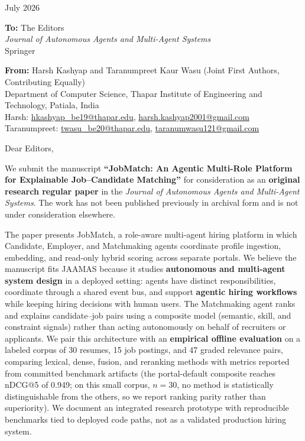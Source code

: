\documentclass[11pt,a4paper]{article}
\begin{document}
 July 2026

\vspace{1.2em}

\noindent\textbf{To:} The Editors\\
\textit{Journal of Autonomous Agents and Multi-Agent Systems}\\
Springer

\vspace{1.2em}

\noindent\textbf{From:} Harsh Kashyap and Taranumpreet Kaur Wasu (Joint First Authors, Contributing Equally)\\
Department of Computer Science, Thapar Institute of Engineering and Technology, Patiala, India\\
Harsh: \url{hkashyap_be19@thapar.edu}, \url{harsh.kashyap2001@gmail.com}\\
Taranumpreet: \url{twasu_be20@thapar.edu}, \url{taranumwasu121@gmail.com}

\vspace{1.5em}

\noindent Dear Editors,

\vspace{0.6em}

We submit the manuscript \textbf{``JobMatch: An Agentic Multi-Role Platform for Explainable Job--Candidate Matching''} for consideration as an \textbf{original research regular paper} in the \textit{Journal of Autonomous Agents and Multi-Agent Systems}. The work has not been published previously in archival form and is not under consideration elsewhere.

The paper presents JobMatch, a role-aware multi-agent hiring platform in which Candidate, Employer, and Matchmaking agents coordinate profile ingestion, embedding, and read-only hybrid scoring across separate portals. We believe the manuscript fits JAAMAS because it studies \textbf{autonomous and multi-agent system design} in a deployed setting: agents have distinct responsibilities, coordinate through a shared event bus, and support \textbf{agentic hiring workflows} while keeping hiring decisions with human users. The Matchmaking agent ranks and explains candidate--job pairs using a composite model (semantic, skill, and constraint signals) rather than acting autonomously on behalf of recruiters or applicants. We pair this architecture with an \textbf{empirical offline evaluation} on a labeled corpus of 30 resumes, 15 job postings, and 47 graded relevance pairs, comparing lexical, dense, fusion, and reranking methods with metrics reported from committed benchmark artifacts (the portal-default composite reaches nDCG@5 of 0.949; on this small corpus, $n{=}30$, no method is statistically distinguishable from the others, so we report ranking parity rather than superiority). We document an integrated research prototype with reproducible benchmarks tied to deployed code paths, not as a validated production hiring system.
\end{document}
